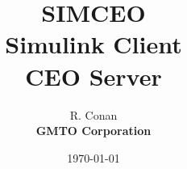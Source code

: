 \documentclass{article}
\begin{document}
\title{{\Huge \textbf{SIMCEO}}\\Simulink Client\\CEO Server}
\author{R. Conan\\\bf GMTO Corporation}
\date{\today}
\maketitle

\clearpage
\tableofcontents
\clearpage

\end{document}
